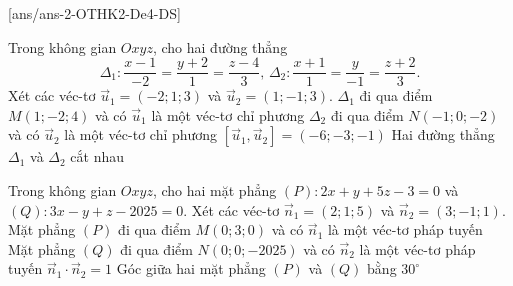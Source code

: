 \cauds
{}[ans/ans-2-OTHK2-De4-DS]
\begin{ex}%
	Trong không gian $Oxyz$, cho hai đường thẳng $$\Delta_1\colon\dfrac{x-1}{-2}=\dfrac{y+2}{1}=\dfrac{z-4}{3},\,\Delta_2\colon \dfrac{x+1}{1}=\dfrac{y}{-1}=\dfrac{z+2}{3}.$$
	Xét các véc-tơ $\overrightarrow{u}_1=(-2;1;3)$ và $\overrightarrow{u}_2=(1;-1;3)$.
	\choiceTF
	{\True $\Delta_1$ đi qua điểm $M(1;-2;4)$ và có $\overrightarrow{u}_1$ là một véc-tơ chỉ phương}
	{\True $\Delta_2$ đi qua điểm $N(-1;0;-2)$ và có $\overrightarrow{u}_2$ là một véc-tơ chỉ phương}
	{$\left[ \overrightarrow{u}_1,\overrightarrow{u}_2\right]=(-6;-3;-1)$}
	{Hai đường thẳng $\Delta_1$ và $\Delta_2$ cắt nhau}
\end{ex}


\begin{ex}%
Trong không gian $Oxyz$, cho hai mặt phẳng $(P)\colon 2x+y+5z-3=0$ và \break $(Q)\colon 3x-y+z-2025=0$. Xét các véc-tơ $\overrightarrow{n}_1=(2;1;5)$ và $\overrightarrow{n}_2=(3;-1;1)$.
\choiceTF
{\True Mặt phẳng $(P)$ đi qua điểm $M(0;3;0)$ và có $\overrightarrow{n}_1$ là một véc-tơ pháp tuyến}
{Mặt phẳng $(Q)$ đi qua điểm $N(0;0;-2025)$ và có $\overrightarrow{n}_2$ là một véc-tơ pháp tuyến}
{$\overrightarrow{n}_1\cdot \overrightarrow{n}_2=1$}
{Góc giữa hai mặt phẳng $(P)$ và $(Q)$ bằng $30^\circ$}
\end{ex}

